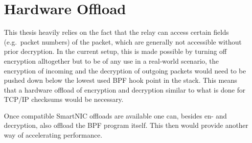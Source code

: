 \section{Hardware Offload}\label{sec:hardware_offload}
This thesis heavily relies on the fact that the relay can
access certain fields (e.g.~packet numbers) of the packet, 
which are generally not accessible without prior decryption.
In the current setup, this is made possible by turning off 
encryption alltogether but to be of any use in a real-world
scenario, the encryption of incoming and the decryption of
outgoing packets would need to be pushed down below the lowest 
used BPF hook point in the stack.
This means that a hardware offload of encryption and decryption
similar to what is done for TCP/IP checksums would be necessary.

Once compatible SmartNIC offloads are available one can, besides 
en- and decryption, also offload the BPF program itself.
This then would provide another way of accelerating performance.
 